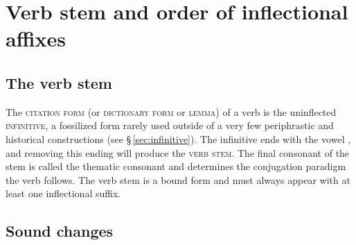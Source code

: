 \section{Verb stem and order of inflectional affixes}


\subsection{The verb stem}

The {\scshape citation form} (or {\scshape dictionary form} or {\scshape lemma}) of
a verb is the uninflected {\scshape infinitive}, a fossilized
form rarely used outside of a very few periphrastic and
historical constructions (see \S\,\ref{sec:infinitive}). The infinitive ends
with the vowel , and removing this ending will produce the {\scshape
verb stem}. The final consonant  of the stem is called the
thematic consonant and determines the conjugation
paradigm the verb follows. The verb stem is a bound form and must always appear
with at least one inflectional suffix.


\subsection{Sound changes}\label{sec:sound-changes}

